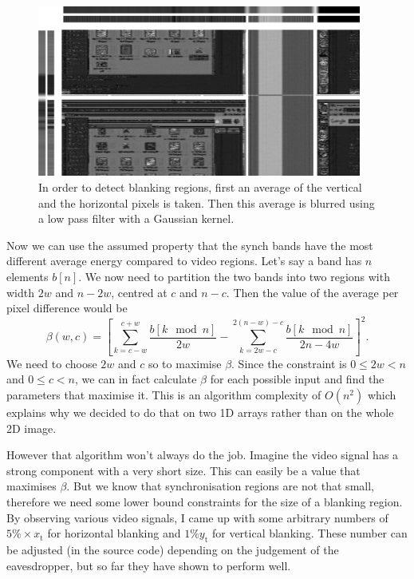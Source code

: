 \documentclass[a4paper,12pt,twoside,openright]{report}
\begin{document}
\begin{figure}[h]
\centering
\includegraphics[width=0.95\textwidth]{framedetection}
\caption{In order to detect blanking regions, first an average of the vertical and the horizontal pixels is taken. Then this average is blurred using a low pass filter with a Gaussian kernel.}
\label{fig:syncingavg}
\end{figure}

Now we can use the assumed property that the synch bands have the most different average energy compared to video regions. Let's say a band has $n$ elements $b[n]$. We now need to partition the two bands into two regions with width $2w$ and $n-2w$, centred at $c$ and $n-c$. Then the value of the average per pixel difference would be
$$ \beta (w, c) =  \left[
\sum_{k=c-w}^{c+w} \frac{b[k \mod n]}{2w} -
\sum_{k=2w-c}^{2(n-w)-c} \frac{b[k \mod n]}{2n-4w}
\right] ^ 2 .$$
We need to choose $2w$ and $c$ so to maximise $\beta$. Since the constraint is $0 \leq 2w < n$ and $0 \leq c < n$, we can in fact calculate $\beta$ for each possible input and find the parameters that maximise it. This is an algorithm complexity of $O(n^2)$ which explains why we decided to do that on two 1D arrays rather than on the whole 2D image.

However that algorithm won't always do the job. Imagine the video signal has a strong component with a very short size. This can easily be a value that maximises $\beta$. But we know that synchronisation regions are not that small, therefore we need some lower bound constraints for the size of a blanking region. By observing various video signals, I came up with some arbitrary numbers of $5\% \times x_\text{t}$ for horizontal blanking and $1\% y_\text{t}$ for vertical blanking. These number can be adjusted (in the source code) depending on the judgement of the eavesdropper, but so far they have shown to perform well.
\end{document}

